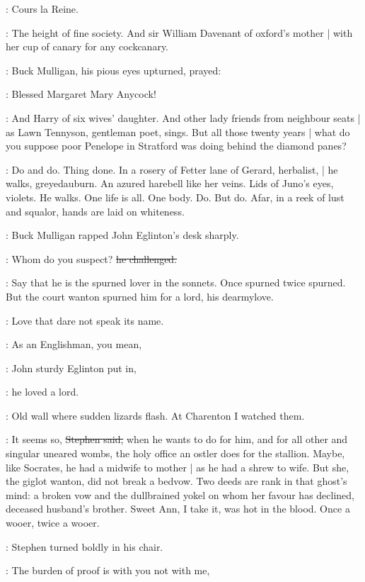 \StephenInt:
Cours la Reine.

\Stephen:
The height of fine society.
And sir William Davenant of oxford's mother |
with her cup of canary for any cockcanary.

:
Buck Mulligan,
his pious eyes upturned,
prayed:

\mulligan:
Blessed Margaret Mary Anycock!

\Stephen:
And Harry of six wives' daughter.
And other lady friends from neighbour seats |
as Lawn Tennyson, gentleman poet, sings.
But all those twenty years |
what do you suppose poor Penelope in Stratford was doing
behind the diamond panes?

\StephenInt:
Do and do.
Thing done.
In a rosery of Fetter lane of Gerard, herbalist, |
he walks, greyedauburn.
An azured harebell like her veins.
Lids of Juno's eyes, violets.
He walks.
One life is all.
One body.
Do.
But do.
Afar,
in a reek of lust and squalor,
hands are laid on whiteness.

:
Buck Mulligan rapped John Eglinton's desk sharply.

\mulligan:
Whom do you suspect?
\sout{he challenged.}

\Stephen:
Say that he is the spurned lover in the sonnets.
Once spurned twice spurned.
But the court wanton spurned him for a lord,
his dearmylove.

\StephenInt:
Love that dare not speak its name.

\eglinton:
As an Englishman,
you mean,

:
John sturdy Eglinton put in,

\eglinton:
he loved a lord.

\StephenInt:
Old wall where sudden lizards flash.
At Charenton I watched them.

\Stephen:
It seems so,
\sout{Stephen said,}
when he wants to do for him,
and for all other and singular uneared wombs,
the holy office an ostler does for the stallion.
Maybe,
like Socrates,
he had a midwife to mother |
as he had a shrew to wife.
But she,
the giglot wanton,
did not break a bedvow.
Two deeds are rank in that ghost's mind:
a broken vow and the dullbrained yokel on whom her favour has declined,
deceased husband's brother.
Sweet Ann,
I take it,
was hot in the blood.
Once a wooer,
twice a wooer.

:
Stephen turned boldly in his chair.

\Stephen:
The burden of proof is with you not with me,

